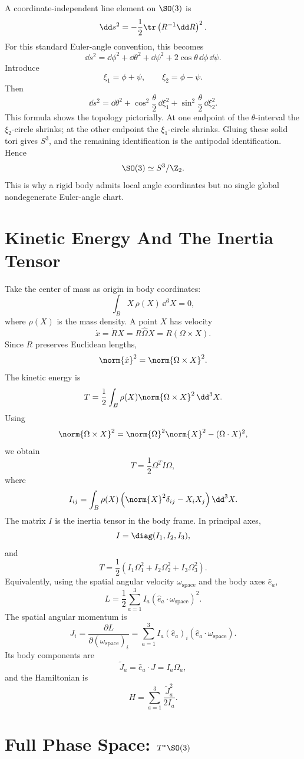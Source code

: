 A coordinate-independent line element on \(\SO(3)\) is
\[
  \dd s^2=-\frac12\tr\left(R^{-1}\dd R\right)^2.
\]
For this standard Euler-angle convention, this becomes
\[
  \dd s^2
  =
  \dd\phi^2+\dd\theta^2+\dd\psi^2
  +2\cos\theta\,\dd\phi\,\dd\psi.
\]
Introduce
\[
  \xi_1=\phi+\psi,\qquad \xi_2=\phi-\psi.
\]
Then
\[
  \dd s^2
  =
  \dd\theta^2
  +
  \cos^2\frac{\theta}{2}\,\dd\xi_1^2
  +
  \sin^2\frac{\theta}{2}\,\dd\xi_2^2.
\]
This formula shows the topology pictorially. At one endpoint of the
\(\theta\)-interval the \(\xi_2\)-circle shrinks; at the other endpoint the
\(\xi_1\)-circle shrinks. Gluing these solid tori gives \(S^3\), and the
remaining identification is the antipodal identification. Hence
\[
  \SO(3)\simeq S^3/\Z_2.
\]
This is why a rigid body admits local angle coordinates but no single global
nondegenerate Euler-angle chart.

\section{Kinetic Energy And The Inertia Tensor}
\label{sec:inertia-tensor}

Take the center of mass as origin in body coordinates:
\[
  \int_B X\,\rho(X)\,\dd^3X=0,
\]
where \(\rho(X)\) is the mass density. A point \(X\) has velocity
\[
  \dot x=\dot R X=R\widehat\Omega X=R(\Omega\times X).
\]
Since \(R\) preserves Euclidean lengths,
\[
  \norm{\dot x}^2=\norm{\Omega\times X}^2.
\]
The kinetic energy is
\[
  T=\frac12\int_B\rho(X)\norm{\Omega\times X}^2\,\dd^3X.
\]
Using
\[
  \norm{\Omega\times X}^2
  =
  \norm{\Omega}^2\norm{X}^2-(\Omega\cdot X)^2,
\]
we obtain
\[
  T=\frac12\Omega^T I\Omega,
\]
where
\[
  I_{ij}
  =
  \int_B\rho(X)
  \left(\norm{X}^2\delta_{ij}-X_iX_j\right)\dd^3X.
\]
The matrix \(I\) is the inertia tensor in the body frame. In principal axes,
\[
  I=\diag(I_1,I_2,I_3),
\]
and
\[
  T=\frac12(I_1\Omega_1^2+I_2\Omega_2^2+I_3\Omega_3^2).
\]
Equivalently, using the spatial angular velocity \(\omega_{\mathrm{space}}\) and the body axes
\(\hat e_a\),
\[
  L=\frac12\sum_{a=1}^3 I_a(\hat e_a\cdot\omega_{\mathrm{space}})^2.
\]
The spatial angular momentum is
\[
  J_i=\frac{\partial L}{\partial (\omega_{\mathrm{space}})_i}
  =
  \sum_{a=1}^3 I_a(\hat e_a)_i(\hat e_a\cdot\omega_{\mathrm{space}}).
\]
Its body components are
\[
  \widetilde J_a=\hat e_a\cdot J=I_a\Omega_a,
\]
and the Hamiltonian is
\[
  H=\sum_{a=1}^3\frac{\widetilde J_a^2}{2I_a}.
\]

\section{\texorpdfstring{Full Phase Space: \(T^*\SO(3)\)}{Full Phase Space: T*SO(3)}}
\label{sec:rigid-full-phase-space}

